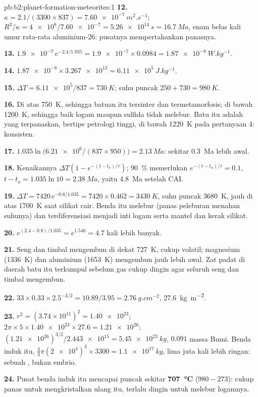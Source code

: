 \begin{solution}{pb:b2:planet-formation-meteorites:1}
\textbf{12.} $\kappa = 2.1/(3300\times837) = \qty{7.60e-7}{m^2.s^{-1}}$;
$R^2/\kappa = \num{4e8}/\num{7.60e-7} = \qty{5.26e14}{s} = \qty{16.7}{Ma}$, enam belas
kali umur rata-rata aluminium-26: pusatnya mempertahankan panasnya.

\textbf{13.} $\num{1.9e-7}\,e^{-2.4/1.035} = \num{1.9e-7}\times0.0984 =
\qty{1.87e-8}{W.kg^{-1}}$.

\textbf{14.} $\num{1.87e-8}\times\num{3.267e13} = \qty{6.11e5}{J.kg^{-1}}$.

\textbf{15.} $\Delta T = \num{6.11e5}/837 = \qty{730}{K}$; suhu puncak
$250 + 730 = \qty{980}{K}$.

\textbf{16.} Di atas \qty{750}{K}, sehingga batuan itu tersinter dan termetamorfosis; di bawah
\qty{1200}{K}, sehingga baik logam maupun sulfida tidak melebur. Batu itu adalah  yang terpanaskan,
bertipe petrologi tinggi, di bawah \qty{1220}{K} pada pertanyaan 4: konsisten.

\textbf{17.} $1.035\ln\bigl(\num{6.21e6}/(837\times950)\bigr) = \qty{2.13}{Ma}$:
sekitar \qty{0.3}{Ma} lebih awal.

\textbf{18.} Kenaikannya $\Delta T(1 - e^{-(t - t_a)/\tau})$; \qty{90}{\percent}
memerlukan $e^{-(t - t_a)/\tau} = 0.1$, $t - t_a = 1.035\ln10 = \qty{2.38}{Ma}$, yaitu
\qty{4.8}{Ma} setelah CAI.

\textbf{19.} $\Delta T = 7420\,e^{-0.8/1.035} = 7420\times0.462 = \qty{3430}{K}$,
suhu puncak \qty{3680}{K}, jauh di atas \qty{1700}{K} saat silikat cair.
Benda itu melebur (panas peleburan menahan suhunya) dan
terdiferensiasi menjadi inti logam serta mantel dan kerak silikat.

\textbf{20.} $e^{(2.4 - 0.8)/1.035} = e^{1.546} = 4.7$ kali lebih banyak.

\textbf{21.} Seng dan timbal mengembun di dekat \qty{727}{K}, cukup volatil; magnesium
(\qty{1336}{K}) dan aluminium (\qty{1653}{K}) mengembun jauh lebih awal. Zat padat
di daerah batu itu terkumpul sebelum gas cukup dingin agar seluruh seng dan
timbal mengembun.

\textbf{22.} $33\times0.33\times2.5^{-3/2} = 10.89/3.95 = \qty{2.76}{g.cm^{-2}}$,
\qty{27.6}{kg.m^{-2}}.

\textbf{23.} $r^2 = (3.74\times10^{11})^2 = \num{1.40e23}$;
$2\pi\times5\times\num{1.40e23}\times27.6 = \num{1.21e26}$;
$(\num{1.21e26})^{3/2}/\num{2.443e15} = \qty{5.45e23}{kg}$, $0.091$ massa Bumi.
Benda induk itu, $\tfrac43\pi(\num{2e4})^3\times3300 = \qty{1.1e17}{kg}$, lima
juta kali lebih ringan: sebuah , bukan embrio.

\textbf{24.} Pusat benda induk itu mencapai puncak sekitar
\textbf{\qty[text-series-to-math=true]{707}{\degreeCelsius}} ($980 - 273$): cukup panas untuk
mengkristalkan ulang  itu, terlalu dingin untuk melebur logamnya.
\end{solution}
